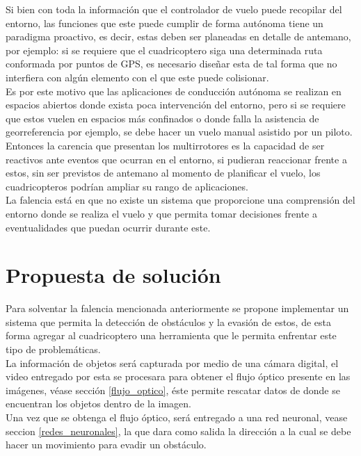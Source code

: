 \documentclass{iccmemoria}
\begin{document}
Si bien con toda la información que el controlador de vuelo puede recopilar del entorno, las funciones que este puede cumplir de forma autónoma tiene un paradigma proactivo, es decir, estas deben ser planeadas en detalle de antemano, por ejemplo: si se requiere que el cuadricoptero siga una determinada ruta conformada por puntos de GPS, es necesario diseñar esta de tal forma que no interfiera con algún elemento con el que este puede colisionar.\\
 
Es por este motivo que las aplicaciones de conducción autónoma se realizan en espacios abiertos donde exista poca intervención del entorno, pero si se requiere que estos vuelen en espacios más confinados o donde falla la asistencia de georreferencia por ejemplo, se debe hacer un vuelo manual asistido por un piloto.\\
 
Entonces la carencia que presentan los multirrotores es la capacidad de ser reactivos ante eventos que ocurran en el entorno, si pudieran reaccionar frente a estos, sin ser previstos de antemano al momento de planificar el vuelo, los cuadricopteros podrían ampliar su rango de aplicaciones.\\
 
La falencia está en que no existe un sistema que proporcione una comprensión del entorno donde se realiza el vuelo y que permita tomar decisiones frente a eventualidades que puedan ocurrir durante este.\\

\section{Propuesta de solución}

Para solventar la falencia mencionada anteriormente se propone implementar un sistema que permita la detección de obstáculos y la evasión de estos, de esta forma agregar al cuadricoptero una herramienta que le permita enfrentar este tipo de problemáticas.\\

La información de objetos será capturada por medio de una cámara digital, el video entregado por esta se procesara para obtener el flujo óptico presente en las imágenes, véase sección \ref{flujo_optico}, éste permite rescatar datos de donde se encuentran los objetos dentro de la imagen.\\

Una vez que se obtenga el flujo óptico, será entregado a una red neuronal, vease seccion \ref{redes_neuronales}, la que dara como salida la dirección a la cual se debe hacer un movimiento para evadir un obstáculo.\\
\end{document}
